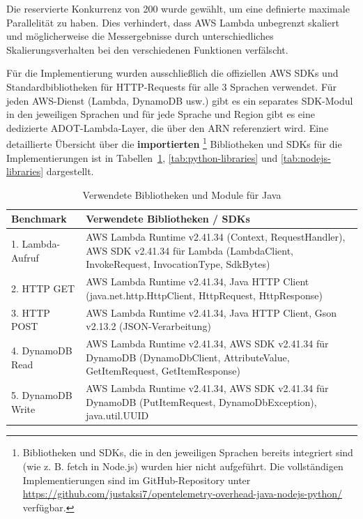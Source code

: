 Die reservierte Konkurrenz von 200 wurde gewählt, um eine definierte maximale Parallelität zu haben. Dies verhindert, 
dass AWS Lambda unbegrenzt skaliert und möglicherweise die Messergebnisse durch unterschiedliches Skalierungsverhalten bei den 
verschiedenen Funktionen verfälscht.

Für die Implementierung wurden ausschließlich die offiziellen AWS SDKs und Standardbibliotheken für HTTP-Requests für alle 3 
Sprachen verwendet. Für jeden AWS-Dienst (Lambda, DynamoDB usw.) gibt es ein separates SDK-Modul in den jeweiligen Sprachen 
und für jede Sprache und Region gibt es eine dedizierte ADOT-Lambda-Layer, die über den \ac{ARN} referenziert wird.
Eine detaillierte Übersicht über die \textbf{importierten} \footnote{Bibliotheken und SDKs, 
die in den jeweiligen Sprachen bereits integriert sind (wie z. B. fetch in Node.js) wurden hier nicht aufgeführt. 
Die vollständigen Implementierungen sind im GitHub-Repository unter \url{https://github.com/justaksi7/opentelemetry-overhead-java-nodejs-python/} verfügbar.} 
Bibliotheken und SDKs für die Implementierungen ist in 
Tabellen~\ref{tab:java-libraries}, \ref{tab:python-libraries} und \ref{tab:nodejs-libraries} dargestellt.

\begin{table}[H]
\centering
\caption{Verwendete Bibliotheken und Module für Java}
\label{tab:java-libraries}
\begin{tabular}{|p{3.5cm}|p{9cm}|}
\hline
\textbf{Benchmark} & \textbf{Verwendete Bibliotheken / SDKs} \\
\hline
1. Lambda-Aufruf & AWS Lambda Runtime v2.41.34 (Context, RequestHandler), AWS SDK v2.41.34 für Lambda (LambdaClient, InvokeRequest, InvocationType, SdkBytes) \\
\hline
2. HTTP GET & AWS Lambda Runtime v2.41.34, Java HTTP Client (java.net.http.HttpClient, HttpRequest, HttpResponse) \\
\hline
3. HTTP POST & AWS Lambda Runtime v2.41.34, Java HTTP Client, Gson v2.13.2 (JSON-Verarbeitung) \\
\hline
4. DynamoDB Read & AWS Lambda Runtime v2.41.34, AWS SDK v2.41.34 für DynamoDB (DynamoDbClient, AttributeValue, GetItemRequest, GetItemResponse) \\
\hline
5. DynamoDB Write & AWS Lambda Runtime v2.41.34, AWS SDK v2.41.34 für DynamoDB (PutItemRequest, DynamoDbException), java.util.UUID \\
\hline
\end{tabular}
\end{table}

